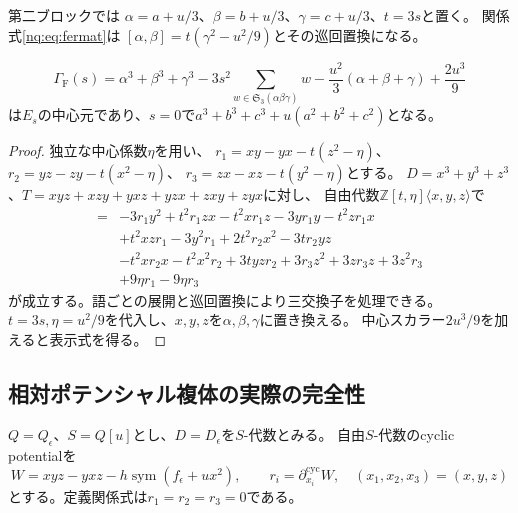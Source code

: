 第二ブロックでは
$\alpha=a+u/3$、$\beta=b+u/3$、$\gamma=c+u/3$、$t=3s$と置く。
関係式\eqref{nq:eq:fermat}は
$[\alpha,\beta]=t(\gamma^2-u^2/9)$とその巡回置換になる。
\begin{lemma}[Fermat側の混合中心元]\label{nq:lem:fermat-center}
\[
 \Gamma_{\mathrm F}(s)=
 \alpha^3+\beta^3+\gamma^3
 -3s^2\!\sum_{w\in\mathfrak S_3(\alpha\beta\gamma)}w
 -\frac{u^2}{3}(\alpha+\beta+\gamma)+\frac{2u^3}{9}
 \tag{F}\label{nq:eq:centerF}
\]
は$E_s$の中心元であり、$s=0$で$a^3+b^3+c^3+u(a^2+b^2+c^2)$となる。
\end{lemma}
\begin{proof}
独立な中心係数$\eta$を用い、
$r_1=xy-yx-t(z^2-\eta)$、$r_2=yz-zy-t(x^2-\eta)$、
$r_3=zx-xz-t(y^2-\eta)$とする。
$D=x^3+y^3+z^3$、$T=xyz+xzy+yxz+yzx+zxy+zyx$に対し、
自由代数$\mathbb Z[t,\eta]\langle x,y,z\rangle$で
\begin{align*}
 [3D-t^2T-9\eta(x+y+z),x]={}&
 -3r_1y^2+t^2r_1zx-t^2xr_1z-3yr_1y-t^2zr_1x\\
 &+t^2xzr_1-3y^2r_1+2t^2r_2x^2-3tr_2yz\\
 &-t^2xr_2x-t^2x^2r_2+3tyzr_2
 +3r_3z^2+3zr_3z+3z^2r_3\\
 &+9\eta r_1-9\eta r_3
\end{align*}
が成立する。語ごとの展開と巡回置換により三交換子を処理できる。
$t=3s,\eta=u^2/9$を代入し、$x,y,z$を$\alpha,\beta,\gamma$に置き換える。
中心スカラー$2u^3/9$を加えると表示式を得る。
\end{proof}

\subsection{相対ポテンシャル複体の実際の完全性}
$Q=Q_\epsilon$、$S=Q[u]$とし、$D=D_\epsilon$を$S$-代数とみる。
自由$S$-代数のcyclic potentialを
\[
 W=xyz-yxz-h\operatorname{sym}(f_\epsilon+ux^2),
 \qquad r_i=\partial^{\mathrm{cyc}}_{x_i}W,\quad(x_1,x_2,x_3)=(x,y,z)
\]
とする。定義関係式は$r_1=r_2=r_3=0$である。

